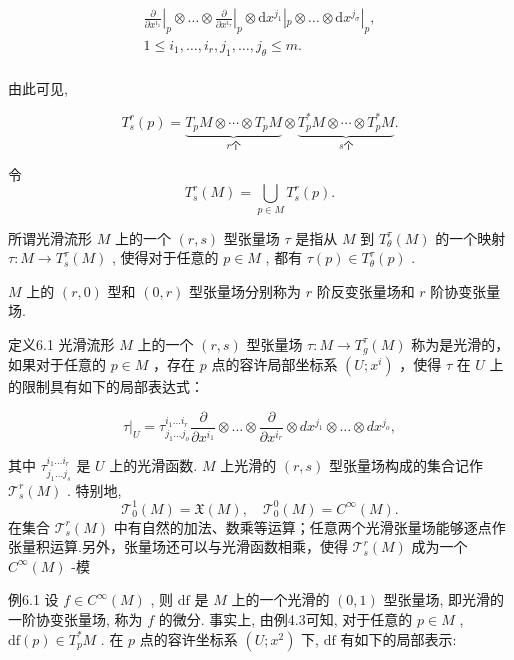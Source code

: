 $$
\begin{array}{l} \left. \frac {\partial}{\partial x ^ {i _ {1}}} \right| _ {p} \otimes \dots \otimes \left. \frac {\partial}{\partial x ^ {i _ {\tau}}} \right| _ {p} \otimes \mathrm {d} x ^ {j _ {1}} | _ {p} \otimes \dots \otimes \mathrm {d} x ^ {j _ {\sigma}} | _ {p}, \\ 1 \leqslant i _ {1}, \dots , i _ {r}, j _ {1}, \dots , j _ {\theta} \leqslant m. \\ \end{array}
$$

由此可见,

$$
T _ {s} ^ {r} (p) = \underbrace {T _ {p} M \otimes \cdots \otimes T _ {p} M} _ {r   \text {个}} \otimes \underbrace {T _ {p} ^ {*} M \otimes \cdots \otimes T _ {p} ^ {*} M} _ {s   \text {个}}.
$$

令
$$
T _ {s} ^ {r} (M) = \bigcup_ {p \in M} T _ {s} ^ {r} (p).
$$

所谓光滑流形  $M$  上的一个  $(r,s)$  型张量场  $\tau$  是指从  $M$  到  $T_{\theta}^{\tau}(M)$  的一个映射  $\tau : M \to T_{s}^{\tau}(M)$ , 使得对于任意的  $p \in M$ , 都有  $\tau(p) \in T_{\theta}^{\tau}(p)$ .

$M$  上的  $(r,0)$  型和  $(0,r)$  型张量场分别称为  $r$  阶反变张量场和  $r$  阶协变张量场.

定义6.1 光滑流形  $M$  上的一个  $(r, s)$  型张量场  $\tau: M \to T_{g}^{\tau}(M)$  称为是光滑的，如果对于任意的  $p \in M$ ，存在  $p$  点的容许局部坐标系  $(U; x^{i})$ ，使得  $\tau$  在  $U$  上的限制具有如下的局部表达式：

$$
\tau | _ {U} = \tau_ {j _ {1} \dots j _ {o}} ^ {i _ {1} \dots i _ {r}} \frac {\partial}{\partial x ^ {i _ {1}}} \otimes \dots \otimes \frac {\partial}{\partial x ^ {i _ {r}}} \otimes d x ^ {j _ {1}} \otimes \dots \otimes d x ^ {j _ {o}},
$$

其中  $\tau_{j_1\dots j_s}^{i_1\dots i_r}$  是  $U$  上的光滑函数.  $M$  上光滑的  $(r,s)$  型张量场构成的集合记作  $\mathcal{T}_s^r (M)$ . 特别地,
$$
\mathcal {T} _ {0} ^ {1} (M) = \mathfrak {X} (M), \quad \mathcal {T} _ {0} ^ {0} (M) = C ^ {\infty} (M).
$$
在集合  $\mathcal{T}_s^r (M)$  中有自然的加法、数乘等运算；任意两个光滑张量场能够逐点作张量积运算.另外，张量场还可以与光滑函数相乘，使得 $\mathcal{T}_s^r (M)$  成为一个  $C^\infty (M)$  -模

例6.1 设  $f \in C^{\infty}(M)$ , 则  $\mathrm{df}$  是  $M$  上的一个光滑的  $(0,1)$  型张量场, 即光滑的一阶协变张量场, 称为  $f$  的微分. 事实上, 由例4.3可知, 对于任意的  $p \in M$ ,  $\mathrm{df}(p) \in T_p^* M$ . 在  $p$  点的容许坐标系  $(U; x^2)$  下,  $\mathrm{df}$  有如下的局部表示:

